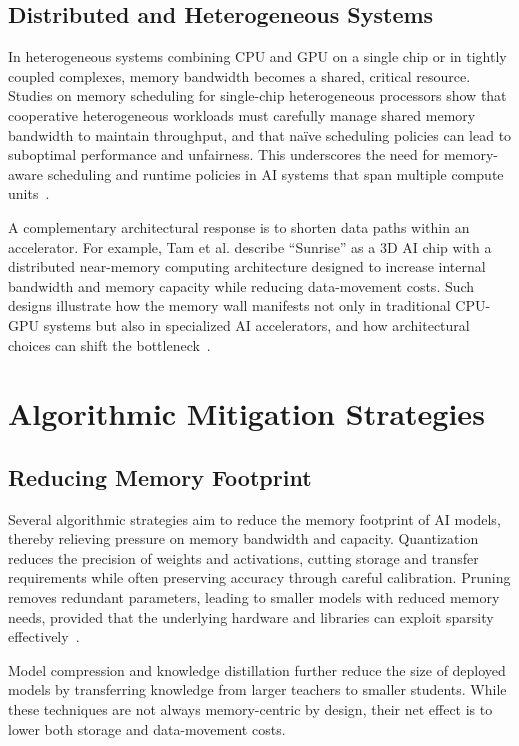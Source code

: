 \documentclass[conference]{IEEEtran}
\begin{document}
\subsection{Distributed and Heterogeneous Systems}

In heterogeneous systems combining CPU and GPU on a single chip or in tightly coupled complexes, memory bandwidth becomes a shared, critical resource. Studies on memory scheduling for single-chip heterogeneous processors show that cooperative heterogeneous workloads must carefully manage shared memory bandwidth to maintain throughput, and that naïve scheduling policies can lead to suboptimal performance and unfairness. This underscores the need for memory-aware scheduling and runtime policies in AI systems that span multiple compute units~\cite{wang2014memory}.

A complementary architectural response is to shorten data paths within an accelerator. For example, Tam et al. describe ``Sunrise'' as a 3D AI chip with a distributed near-memory computing architecture designed to increase internal bandwidth and memory capacity while reducing data-movement costs. Such designs illustrate how the memory wall manifests not only in traditional CPU-GPU systems but also in specialized AI accelerators, and how architectural choices can shift the bottleneck~\cite{sunrise2020}.

\section{Algorithmic Mitigation Strategies}
\label{sec:algorithms}

\subsection{Reducing Memory Footprint}

Several algorithmic strategies aim to reduce the memory footprint of AI models, thereby relieving pressure on memory bandwidth and capacity. Quantization reduces the precision of weights and activations, cutting storage and transfer requirements while often preserving accuracy through careful calibration. Pruning removes redundant parameters, leading to smaller models with reduced memory needs, provided that the underlying hardware and libraries can exploit sparsity effectively~\cite{gholami2024ai,roy2025breaking}.

Model compression and knowledge distillation further reduce the size of deployed models by transferring knowledge from larger teachers to smaller students. While these techniques are not always memory-centric by design, their net effect is to lower both storage and data-movement costs.
\end{document}
